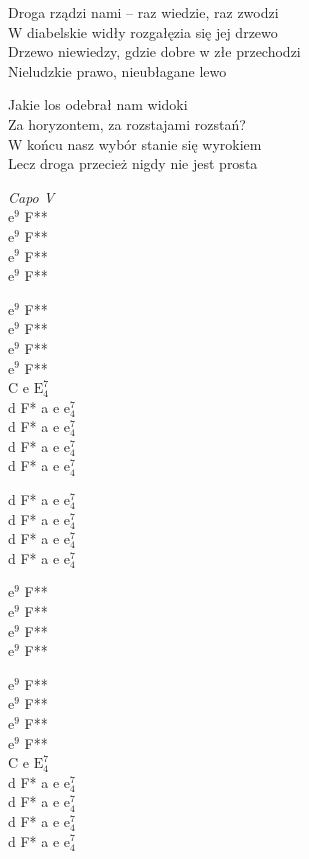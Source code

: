 \begin{text}
Droga rządzi nami – raz wiedzie, raz zwodzi\\
W diabelskie widły rozgałęzia się jej drzewo\\
Drzewo niewiedzy, gdzie dobre w złe przechodzi\\
Nieludzkie prawo, nieubłagane lewo

Jakie los odebrał nam widoki\\
Za horyzontem, za rozstajami rozstań?\\
W końcu nasz wybór stanie się wyrokiem\\
Lecz droga przecież nigdy nie jest prosta
\end{text}
\begin{chord}
    \textit{Capo V}\\
    $\mathrm{e^9}$ F**\\
    $\mathrm{e^9}$ F**\\
    $\mathrm{e^9}$ F**\\
    $\mathrm{e^9}$ F**

    $\mathrm{e^9}$ F**\\
    $\mathrm{e^9}$ F**\\
    $\mathrm{e^9}$ F**\\
    $\mathrm{e^9}$ F**\\
    C e $\mathrm{E^7_4}$\\
    d F* a e $\mathrm{e^7_4}$\\
    d F* a e $\mathrm{e^7_4}$\\
    d F* a e $\mathrm{e^7_4}$\\
    d F* a e $\mathrm{e^7_4}$

    d F* a e $\mathrm{e^7_4}$\\
    d F* a e $\mathrm{e^7_4}$\\
    d F* a e $\mathrm{e^7_4}$\\
    d F* a e $\mathrm{e^7_4}$

    $\mathrm{e^9}$ F**\\
    $\mathrm{e^9}$ F**\\
    $\mathrm{e^9}$ F**\\
    $\mathrm{e^9}$ F**

    $\mathrm{e^9}$ F**\\
    $\mathrm{e^9}$ F**\\
    $\mathrm{e^9}$ F**\\
    $\mathrm{e^9}$ F**\\
    C e $\mathrm{E^7_4}$\\
    d F* a e $\mathrm{e^7_4}$\\
    d F* a e $\mathrm{e^7_4}$\\
    d F* a e $\mathrm{e^7_4}$\\
    d F* a e $\mathrm{e^7_4}$


\end{chord}
